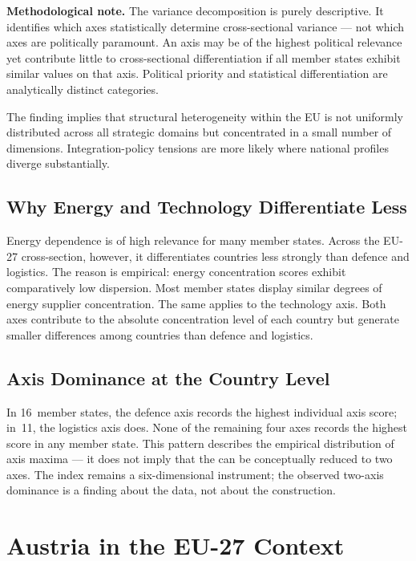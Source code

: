 \textbf{Methodological note.}
The variance decomposition is purely descriptive.  It identifies
which axes statistically determine cross-sectional variance --- not
which axes are politically paramount.  An axis may be of the
highest political relevance yet contribute little to cross-sectional
differentiation if all member states exhibit similar values on that
axis.  Political priority and statistical differentiation are
analytically distinct categories.

The finding implies that structural heterogeneity within the EU is
not uniformly distributed across all strategic domains but
concentrated in a small number of dimensions.  Integration-policy
tensions are more likely where national profiles diverge
substantially.

\subsection{Why Energy and Technology Differentiate Less}

Energy dependence is of high relevance for many member states.
Across the EU-27 cross-section, however, it differentiates
countries less strongly than defence and logistics.  The reason is
empirical: energy concentration scores exhibit comparatively low
dispersion.  Most member states display similar degrees of
energy supplier concentration.  The same applies to the technology
axis.  Both axes contribute to the absolute concentration level of
each country but generate smaller differences among countries than
defence and logistics.

\subsection{Axis Dominance at the Country Level}

In 16~member states, the defence axis records the highest
individual axis score; in~11, the logistics axis does.  None of the
remaining four axes records the highest score in any member state.
This pattern describes the empirical distribution of axis
maxima --- it does not imply that the \ISI can be conceptually
reduced to two axes.  The index remains a six-dimensional
instrument; the observed two-axis dominance is a finding about the
data, not about the construction.


\section{Austria in the EU-27 Context}
\label{sec:austria}

